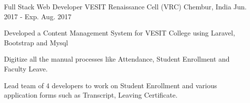 \begin{cventries}
  \cventry
    {Full Stack Web Developer}
    {VESIT Renaissance Cell (VRC) }
    {Chembur, India}
    {Jun. 2017 - Exp. Aug. 2017}
    {
      \begin{cvitems}
        \item {Developed a Content Management System for VESIT     College using Laravel, Bootstrap and Mysql}
        \item {Digitize all the manual processes like Attendance, Student Enrollment and Faculty Leave.}
        \item {Lead team of 4 developers to work on Student Enrollment and various application forms such as Transcript, Leaving Certificate.}
      \end{cvitems}
    }
    
\end{cventries}
